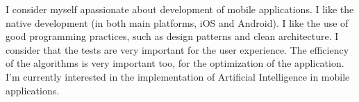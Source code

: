 \documentclass[8pt]{developercv} %
\begin{document}
\vspace{0.5cm}



	
	
	

I consider myself apassionate about development of mobile applications. I like the native development (in both main platforms, iOS and Android). I like the use of good programming practices, such as design patterns and clean architecture. I consider that the tests are very important for the user experience. The efficiency of the algorithms is very important too, for the optimization of the application. I'm currently interested in the implementation of Artificial Intelligence in mobile applications.


\end{document}
